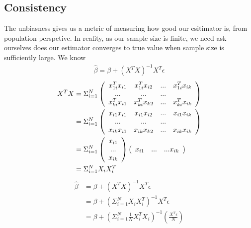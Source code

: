 \documentclass[a4paper]{article}
\begin{document}
\subsection{Consistency}
The unbiasness gives us a metric of measuring how good our esitimator is, from population perspetive. In reality, as our sample size is finite, we need ask ourselves does our estimator converges to true value when sample size is sufficiently large. We know
\begin{align*}
\hat \beta = \beta + (X^TX)^{-1}X^T\epsilon
\end{align*}
\begin{align*}
X^TX & = \Sigma_{i=1}^N
 \left( \begin{array} { c  c  c c } 
                   x_{1i}^Tx_{i1} & x_{1i}^Tx_{i2} & ... & x^T_{1i}x_{ik}   \\
                   ... & ... & ... & \\
                   x_{ki}^Tx_{i1} & x_{ki}^Tx_{k2} & ... & x^T_{ki}x_{ik}   \\
           \end{array} \right) \\
    & =  \Sigma_{i=1}^N
 \left( \begin{array} { c  c  c c } 
                   x_{i1}x_{i1} & x_{i1}x_{i2} & ... & x_{i1}x_{ik}   \\
                   ... & ... & ... & \\
                   x_{ik}x_{i1} & x_{ik}x_{k2} & ... & x_{ik}x_{ik}   \\
           \end{array} \right) \\
      &  =  \Sigma_{i=1}^N
 \left( \begin{array} { c  } 
                   x_{i1}    \\
                   ...  \\
                   x_{ik}    \\
           \end{array} \right)
 \left( \begin{array} { c c c c } 
                   x_{i1}  & ... &  ... x_{ik}\\ 
           \end{array} \right) \\
     & = \Sigma_{i=1}^N X_i X_i^T
\end{align*}
\begin{align*}
\hat \beta &= \beta + ({X^TX})^{-1} {X^T \epsilon} \\
               &= \beta + ( \Sigma_{i=1}^N X_i X_i^T)^{-1} X^T \epsilon \\
               &= \beta + ( \Sigma_{i=1}^N  \frac{1}{N}{X_i^TX_i})^{-1}(\frac{X^T \epsilon}{N})
\end{align*}
\end{document}
